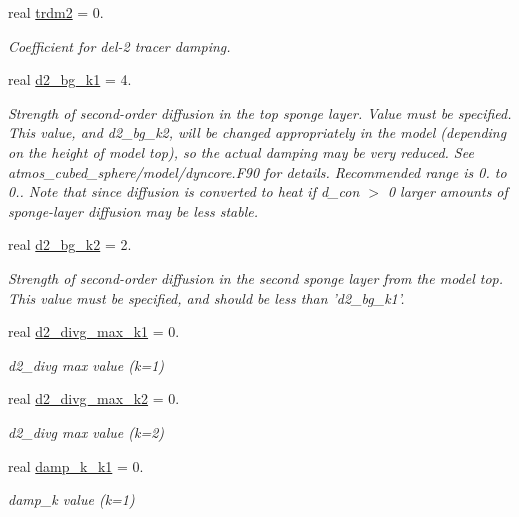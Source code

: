\begin{DoxyCompactItemize}
real \hyperlink{structfv__arrays__mod_1_1fv__flags__type_a4a2e560c5d7f89ce6f1c6bdc14b26c43}{trdm2} = 0.
\begin{DoxyCompactList}\small\item\em Coefficient for del-\/2 tracer damping. \end{DoxyCompactList}\item 
real \hyperlink{structfv__arrays__mod_1_1fv__flags__type_a737de90ac392b70940b9279692e09107}{d2\-\_\-bg\-\_\-k1} = 4.
\begin{DoxyCompactList}\small\item\em Strength of second-\/order diffusion in the top sponge layer. Value must be specified. This value, and d2\-\_\-bg\-\_\-k2, will be changed appropriately in the model (depending on the height of model top), so the actual damping may be very reduced. See atmos\-\_\-cubed\-\_\-sphere/model/dyncore.\-F90 for details. Recommended range is 0. to 0.. Note that since diffusion is converted to heat if d\-\_\-con $>$ 0 larger amounts of sponge-\/layer diffusion may be less stable. \end{DoxyCompactList}\item 
real \hyperlink{structfv__arrays__mod_1_1fv__flags__type_a2c3e75d400dd64212d1b1b7a22dfa0ce}{d2\-\_\-bg\-\_\-k2} = 2.
\begin{DoxyCompactList}\small\item\em Strength of second-\/order diffusion in the second sponge layer from the model top. This value must be specified, and should be less than 'd2\-\_\-bg\-\_\-k1'. \end{DoxyCompactList}\item 
real \hyperlink{structfv__arrays__mod_1_1fv__flags__type_a22e01e2b95246dc8477bab2b3b162399}{d2\-\_\-divg\-\_\-max\-\_\-k1} = 0.
\begin{DoxyCompactList}\small\item\em d2\-\_\-divg max value (k=1) \end{DoxyCompactList}\item 
real \hyperlink{structfv__arrays__mod_1_1fv__flags__type_a69f302ae25d38e4087c57150f2e2aa30}{d2\-\_\-divg\-\_\-max\-\_\-k2} = 0.
\begin{DoxyCompactList}\small\item\em d2\-\_\-divg max value (k=2) \end{DoxyCompactList}\item 
real \hyperlink{structfv__arrays__mod_1_1fv__flags__type_a7a9b69cda3a1074c4d5bc3f9d1d7ed30}{damp\-\_\-k\-\_\-k1} = 0.
\begin{DoxyCompactList}\small\item\em damp\-\_\-k value (k=1) \end{DoxyCompactList}\item 

\end{DoxyCompactItemize}
